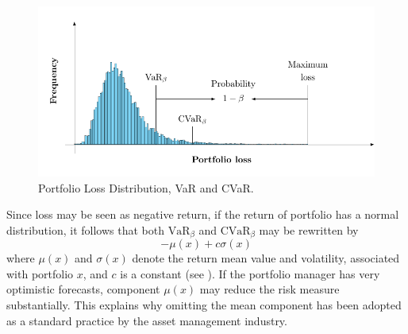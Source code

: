 \begin{figure}[!ht]
	\centering
	\includegraphics{figures/VarCvar.pdf}
	\caption{Portfolio Loss Distribution, VaR and CVaR.}
	\label{fig:VarCvar}
\end{figure}

\begin{remark}\normalfont\label{re:Normal}

	Since loss may be seen as negative return, if the return of portfolio has a normal distribution, it follows that both $\mbox{VaR}_\beta$ and $\mbox{CVaR}_\beta$ may be rewritten by
	\[
		-\mu(x)+c\sigma(x)
	\]
	where $\mu(x)$ and $\sigma(x)$ denote the return mean value and volatility,  associated with portfolio $x$, and $c$ is a constant (see \cite[Chapter 2]{Roncalli2014}). If the portfolio manager has very optimistic forecasts, component $\mu(x)$ may reduce the risk measure substantially. This explains why omitting the mean component has been adopted as a standard practice by the asset management industry.
\end{remark}

